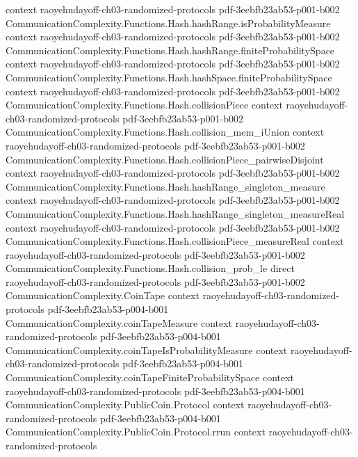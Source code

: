 \begin{theorem}
  {context}
  {raoyehudayoff-ch03-randomized-protocols}
  {pdf-3eebfb23ab53-p001-b002}
\proofstep
  {CommunicationComplexity.Functions.Hash.hashRange.isProbabilityMeasure}
  {context}
  {raoyehudayoff-ch03-randomized-protocols}
  {pdf-3eebfb23ab53-p001-b002}
\proofstep
  {CommunicationComplexity.Functions.Hash.hashRange.finiteProbabilitySpace}
  {context}
  {raoyehudayoff-ch03-randomized-protocols}
  {pdf-3eebfb23ab53-p001-b002}
\proofstep
  {CommunicationComplexity.Functions.Hash.hashSpace.finiteProbabilitySpace}
  {context}
  {raoyehudayoff-ch03-randomized-protocols}
  {pdf-3eebfb23ab53-p001-b002}
\proofstep
  {CommunicationComplexity.Functions.Hash.collisionPiece}
  {context}
  {raoyehudayoff-ch03-randomized-protocols}
  {pdf-3eebfb23ab53-p001-b002}
\proofstep
  {CommunicationComplexity.Functions.Hash.collision_mem_iUnion}
  {context}
  {raoyehudayoff-ch03-randomized-protocols}
  {pdf-3eebfb23ab53-p001-b002}
\proofstep
  {CommunicationComplexity.Functions.Hash.collisionPiece_pairwiseDisjoint}
  {context}
  {raoyehudayoff-ch03-randomized-protocols}
  {pdf-3eebfb23ab53-p001-b002}
\proofstep
  {CommunicationComplexity.Functions.Hash.hashRange_singleton_measure}
  {context}
  {raoyehudayoff-ch03-randomized-protocols}
  {pdf-3eebfb23ab53-p001-b002}
\proofstep
  {CommunicationComplexity.Functions.Hash.hashRange_singleton_measureReal}
  {context}
  {raoyehudayoff-ch03-randomized-protocols}
  {pdf-3eebfb23ab53-p001-b002}
\proofstep
  {CommunicationComplexity.Functions.Hash.collisionPiece_measureReal}
  {context}
  {raoyehudayoff-ch03-randomized-protocols}
  {pdf-3eebfb23ab53-p001-b002}
\proofstep
  {CommunicationComplexity.Functions.Hash.collision_prob_le}
  {direct}
  {raoyehudayoff-ch03-randomized-protocols}
  {pdf-3eebfb23ab53-p001-b002}
\proofstep
  {CommunicationComplexity.CoinTape}
  {context}
  {raoyehudayoff-ch03-randomized-protocols}
  {pdf-3eebfb23ab53-p004-b001}
\proofstep
  {CommunicationComplexity.coinTapeMeasure}
  {context}
  {raoyehudayoff-ch03-randomized-protocols}
  {pdf-3eebfb23ab53-p004-b001}
\proofstep
  {CommunicationComplexity.coinTapeIsProbabilityMeasure}
  {context}
  {raoyehudayoff-ch03-randomized-protocols}
  {pdf-3eebfb23ab53-p004-b001}
\proofstep
  {CommunicationComplexity.coinTapeFiniteProbabilitySpace}
  {context}
  {raoyehudayoff-ch03-randomized-protocols}
  {pdf-3eebfb23ab53-p004-b001}
\proofstep
  {CommunicationComplexity.PublicCoin.Protocol}
  {context}
  {raoyehudayoff-ch03-randomized-protocols}
  {pdf-3eebfb23ab53-p004-b001}
\proofstep
  {CommunicationComplexity.PublicCoin.Protocol.rrun}
  {context}
  {raoyehudayoff-ch03-randomized-protocols}

\end{theorem}
